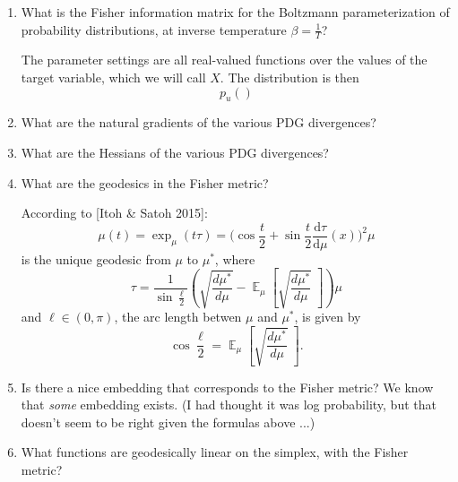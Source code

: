 \documentclass{article}
\newcommand\Ex{\mathop{\mathbb{E}}}
\newcommand\quest[1]{\textsf{\large\color{blue} #1}\par}
\begin{document}
\begin{enumerate}[label={\textsf{\large\color{blue}\arabic*.}}]
\item \quest{
        What is the Fisher information matrix for the Boltzmann parameterization of
            probability distributions, at inverse temperature $\beta = \frac1T$?
    }
    
    The parameter settings are all real-valued functions over the values of the target variable, which we will call $X$. The distribution is then 
    \[
        p_u( )
    \]
    
\item \quest{What are the natural gradients of the various PDG divergences?}
\item \quest{What are the Hessians of the various PDG divergences?}
\item \quest{What are the geodesics in the Fisher metric?}
    
    According to [Itoh \& Satoh 2015]:
    \[
        \mu(t) = \exp_\mu (t \tau) = \Big(\cos \frac t2 + \sin \frac t2 \frac{\mathrm d\tau}{\mathrm d\mu}(x) \Big)^2 \mu
    \]
    is the unique geodesic from $\mu$ to $\mu^*$, where
    \[
        \tau = \frac1{\sin \frac{\ell}2} \left( 
            \sqrt{\frac{d\mu^*}{d\mu}} - \Ex_{\mu}\left[\sqrt{\frac{d\mu^*}{d\mu}}\;\right] 
        \right) \mu
    \]
    and $\ell \in (0, \pi)$, the arc length betwen $\mu$ and $\mu^*$, is given by
    \[
        \cos \frac\ell2 = \Ex_{\mu}\left[\sqrt{\frac{d\mu^*}{d\mu}}\;\right].
    \]
    
\item \quest{Is there a nice embedding that corresponds to the Fisher metric? We know that \emph{some} embedding exists. {\small\color{blue!50!white}(I had thought it was log probability, but that doesn't seem to be right given the formulas above ...)}}
\item \quest{What functions are geodesically linear on the simplex, with the Fisher metric?}
    
    
\end{enumerate}
\end{document}
